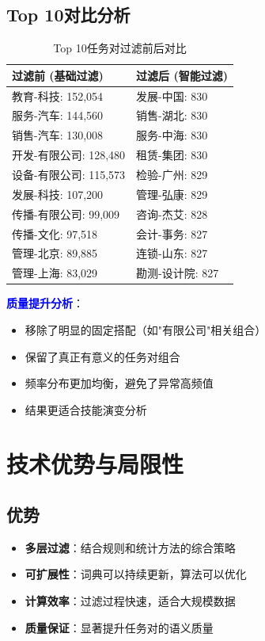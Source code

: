 \documentclass[11pt,a4paper]{article}
\begin{document}
\subsection{Top 10对比分析}

\begin{table}[h]
\centering
\begin{tabular}{ll}
\toprule
\textbf{过滤前 (基础过滤)} & \textbf{过滤后 (智能过滤)} \\
\midrule
教育-科技: 152,054 & 发展-中国: 830 \\
服务-汽车: 144,560 & 销售-湖北: 830 \\
销售-汽车: 130,008 & 服务-中海: 830 \\
开发-有限公司: 128,480 & 租赁-集团: 830 \\
设备-有限公司: 115,573 & 检验-广州: 829 \\
发展-科技: 107,200 & 管理-弘康: 829 \\
传播-有限公司: 99,009 & 咨询-杰艾: 828 \\
传播-文化: 97,518 & 会计-事务: 827 \\
管理-北京: 89,885 & 连锁-山东: 827 \\
管理-上海: 83,029 & 勘测-设计院: 827 \\
\bottomrule
\end{tabular}
\caption{Top 10任务对过滤前后对比}
\end{table}

\textcolor{blue}{\textbf{质量提升分析}}：
\begin{itemize}
    \item 移除了明显的固定搭配（如"有限公司"相关组合）
    \item 保留了真正有意义的任务对组合
    \item 频率分布更加均衡，避免了异常高频值
    \item 结果更适合技能演变分析
\end{itemize}

\section{技术优势与局限性}

\subsection{优势}

\begin{itemize}
    \item \textbf{多层过滤}：结合规则和统计方法的综合策略
    \item \textbf{可扩展性}：词典可以持续更新，算法可以优化
    \item \textbf{计算效率}：过滤过程快速，适合大规模数据
    \item \textbf{质量保证}：显著提升任务对的语义质量
\end{itemize}
\end{document}
